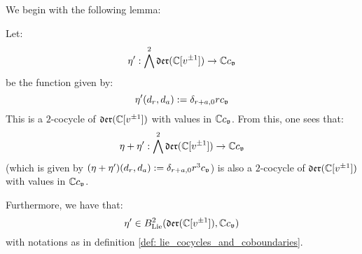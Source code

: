         We begin with the following lemma:
        \begin{lemma} \label{lemma: a_virasoro_coboundary}
            Let:
                $$\eta': \bigwedge^2 \mathfrak{der}(\mathbb{C}[v^{\pm 1}]) \to \mathbb{C} c_{\mathfrak{v}}$$
            be the function given by:
                $$\eta'(d_r, d_a) := \delta_{r + a, 0} r c_{\mathfrak{v}}$$
            This is a $2$-cocycle of $\mathfrak{der}(\mathbb{C}[v^{\pm 1}])$ with values in $\mathbb{C} c_{\mathfrak{v}}$. From this, one sees that:
                $$\eta + \eta': \bigwedge^2 \mathfrak{der}(\mathbb{C}[v^{\pm 1}]) \to \mathbb{C} c_{\mathfrak{v}}$$
            (which is given by $(\eta + \eta')(d_r, d_a) := \delta_{r + a, 0} r^3 c_{\mathfrak{v}}$) is also a $2$-cocycle of $\mathfrak{der}(\mathbb{C}[v^{\pm 1}])$ with values in $\mathbb{C} c_{\mathfrak{v}}$. 

            Furthermore, we have that:
                $$\eta' \in B^2_{\mathrm{Lie}}( \mathfrak{der}(\mathbb{C}[v^{\pm 1}]), \mathbb{C} c_{\mathfrak{v}} )$$
            with notations as in definition \ref{def: lie_cocycles_and_coboundaries}.
        \end{lemma}
